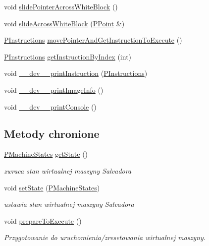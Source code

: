 \begin{CompactItemize}
\item 
void \hyperlink{classPVirtualMachine_e37d4dfa512c3dd97b9958f013ffb7b3}{slidePointerAcrossWhiteBlock} ()
\item 
void \hyperlink{classPVirtualMachine_4b2ebb998393324c5240dc48fdb14f3a}{slideAcrossWhiteBlock} (\hyperlink{structstruct__point}{PPoint} \&)
\item 
\hyperlink{penums_8h_797d2a71195500b970298fbf455ff83a}{PInstructions} \hyperlink{classPVirtualMachine_29279548406a588bce03e320354cd857}{movePointerAndGetInstructionToExecute} ()
\item 
\hyperlink{penums_8h_797d2a71195500b970298fbf455ff83a}{PInstructions} \hyperlink{classPVirtualMachine_69d12176d3f9719b2bdf93a9f55cefde}{getInstructionByIndex} (int)
\item 
void \hyperlink{classPVirtualMachine_91c888349242ed7700d5ddff5b187c19}{\_\-\_\-dev\_\-\_\-printInstruction} (\hyperlink{penums_8h_797d2a71195500b970298fbf455ff83a}{PInstructions})
\item 
void \hyperlink{classPVirtualMachine_d0ac4994cbf5c218a40442df49a3cd29}{\_\-\_\-dev\_\-\_\-printImageInfo} ()
\item 
void \hyperlink{classPVirtualMachine_9fbb7c0313e22051eebfd2e316ec609b}{\_\-\_\-dev\_\-\_\-printConsole} ()
\end{CompactItemize}
\subsection*{Metody chronione}
\begin{CompactItemize}
\item 
\hyperlink{penums_8h_3b12ec7c990da3435462047165bc0c6d}{PMachineStates} \hyperlink{classPVirtualMachine_699839f4df2106065458127c36b4bfca}{getState} ()
\begin{CompactList}\small\item\em zwraca stan wirtualnej maszyny Salvadora \item\end{CompactList}\item 
void \hyperlink{classPVirtualMachine_bede8c1e068c19b9bc61a957de70cda8}{setState} (\hyperlink{penums_8h_3b12ec7c990da3435462047165bc0c6d}{PMachineStates})
\begin{CompactList}\small\item\em ustawia stan wirtualnej maszyny Salvadora \item\end{CompactList}\item 
void \hyperlink{classPVirtualMachine_513af8673f1430cd04fd0a0e46abedd4}{prepareToExecute} ()
\begin{CompactList}\small\item\em Przygotowanie do uruchomienia/zresetowania wirtualnej maszyny. \item\end{CompactList}\end{CompactItemize}
